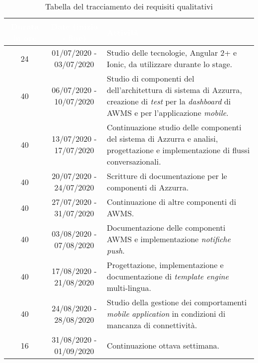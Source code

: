 \begin{table}[h]%
	\renewcommand{\arraystretch}{1.5}
	\centering
\begin{tabularx}{\textwidth}{c c X}
	\hline	
	\rowcolor{SchoolColor}
	\textcolor{white}{\textbf{Durata in ore}} & \textcolor{white}{\textbf{Date (inizio - fine)}} & \textcolor{white}{\textbf{Attività}} \\	
	\hline			
	24 &  01/07/2020 - 03/07/2020 & Studio delle tecnologie, Angular 2+ e Ionic, da utilizzare durante lo stage.\\

	40 &  06/07/2020 - 10/07/2020 & Studio di componenti del dell'architettura di sistema di Azzurra, creazione di \emph{test} per la \emph{dashboard} di \gls{AWMS} e per l'applicazione \emph{mobile}. \\

	40 &  13/07/2020 - 17/07/2020 & Continuazione studio delle componenti del sistema di Azzurra e analisi, progettazione e implementazione di flussi conversazionali.\\

	40 &  20/07/2020 - 24/07/2020 & Scritture di documentazione per le componenti di Azzurra.\\

	40 &  27/07/2020 - 31/07/2020 & Continuazione di altre componenti di \gls{AWMS}.\\

	40 &  03/08/2020 - 07/08/2020 & Documentazione delle componenti \gls{AWMS} e implementazione \emph{notifiche push}.\\

	40 &  17/08/2020 - 21/08/2020 & Progettazione, implementazione e documentazione di \emph{template engine} multi-lingua.\\

	40 &  24/08/2020 - 28/08/2020 & Studio della gestione dei comportamenti \emph{mobile} \emph{application} in condizioni di mancanza di connettività.\\

	16 &  31/08/2020 - 01/09/2020 & Continuazione ottava settimana. \\
	\hline
\end{tabularx} \hbox{}

\caption{Tabella del tracciamento dei requisiti qualitativi}
\end{table}%

